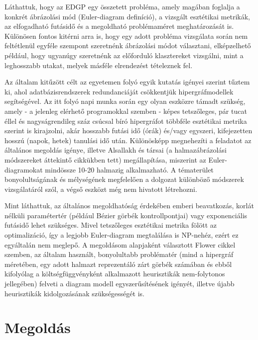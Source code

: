 Láthattuk, hogy az EDGP egy összetett probléma, amely magában foglalja a konkrét ábrázolási mód (Euler-diagram definíció), a vizsgált esztétikai metrikák, az elfogadható futásidő és a megoldható problémaméret meghatározását is. Különösen fontos kitérni arra is, hogy egy adott probléma vizsgálata során nem feltétlenül egyféle szempont szeretnénk ábrázolási módot választani, elképzelhető például, hogy ugyanúgy szeretnénk az előforduló klasztereket vizsgálni, mint a leghosszabb utakat, melyek másféle elrendezést tételeznek fel.


Az általam kitűzött célt az egyetemen folyó egyik kutatás igényei szerint tűztem ki, ahol adatbázisrendszerek redundanciáját csökkentjük hipergráfmodellek segítségével. Az itt folyó napi munka során egy olyan eszközre támadt szükség, amely - a jelenleg elérhető programokkal szemben - képes tetszőleges, pár tucat éllel és nagyságrendileg száz csúcsal bíró hipergráfot többféle esztétikai metrika szerint is kirajzolni, akár hosszabb futási idő (órák) és/vagy egyszeri, kifejezetten hosszú (napok, hetek) tanulási idő után. Különösképp megnehezíti a feladatot az általános megoldás igénye, illetve Alsallakh és társai (a halmazábrázolási módszereket áttekintő cikkükben\cite{alsallakah2016_the_state_of_the_art_set_visualization} tett) megállapítása, miszerint az Euler-diagramokat mindössze 10-20 halmazig alkalmazható. A tématerület bonyolultságának és mélységének megfelelően a dolgozat különböző módszerek vizsgálatáról szól, a végső eszközt még nem hivatott létrehozni.


Mint láthattuk, az általános megoldhatóság érdekében emberi beavatkozás, korlát nélküli paramétertér (például Bézier görbék kontrollpontjai\cite{layout_metrics}) vagy exponenciális futásidő\cite{inductive_euler} lehet szükséges. Mivel tetszőleges esztétikai metrika fölött az optimalizáció, így a legjobb Euler-diagram megtalálása is NP-nehéz, ezért ez egyáltalán nem meglepő. A megoldásom alapjaként választott Flower cikkel\cite{layout_metrics} szemben, az általam használt, bonyolultabb problématér (mind a hipergráf méretében, egy adott halmazt reprezentáló zárt görbék számában és ebből kifolyólag a költségfüggvényként alkalmazott heurisztikák nem-folytonos jellegében) felveti a diagram modell egyszerűsítésének igényét, illetve újabb heurisztikák kidolgozásának szükségességét is.


\section{Megoldás}

